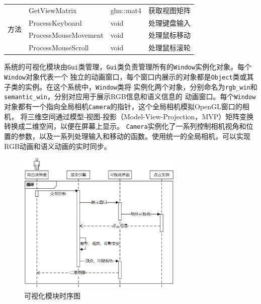 \begin{table}[htb]
\begin{tabular}{|l|m{4cm}|m{3cm}|m{5cm}|}
		\multirow{4}{*}{方法}  & \centering\arraybackslash GetViewMatrix        & \centering\arraybackslash glm::mat4 & \centering\arraybackslash 获取视图矩阵                \\ \cline{2-4}
		                     & \centering\arraybackslash ProcessKeyboard      & \centering\arraybackslash void      & \centering\arraybackslash 处理键盘输入                \\ \cline{2-4}
		                     & \centering\arraybackslash ProcessMouseMovement & \centering\arraybackslash void      & \centering\arraybackslash 处理鼠标移动                \\ \cline{2-4}
		                     & \centering\arraybackslash ProcessMouseScroll   & \centering\arraybackslash void      & \centering\arraybackslash 处理鼠标滚轮                \\ \hline
	\end{tabular}
\end{table}

\par 系统的可视化模块由\texttt{Gui}类管理，\texttt{Gui}类负责管理所有的\texttt{Window}实例化对象。每个\texttt{Window}对象代表一个
独立的动画窗口，每个窗口内展示的对象都是\texttt{Object}类或其子类的实例。在这个系统中，\texttt{Window}类将
实例化两个对象，分别命名为\texttt{rgb\_win}和\texttt{semantic\_win}，分别对应用于展示RGB信息和语义信息的
动画窗口。每个\texttt{Window}对象都有一个指向全局相机\texttt{Camera}的指针，这个全局相机模拟OpenGL窗口的相机，
将三维空间通过模型-视图-投影（Model-View-Projection，MVP）矩阵变换转换成二维空间，以便在屏幕上显示。
\texttt{Camera}实例化了一系列控制相机视角和位置的参数，以及一系列处理输入和移动的函数。使用统一的全局相机，可以实现RGB动画和语义动画的实时同步。

\begin{figure}[htb]
	\centering
	\includegraphics[width=0.7\textwidth]{figures/uml/sequence5.png}
	\caption{可视化模块时序图}
	\label{fig:sequence5}
\end{figure}

